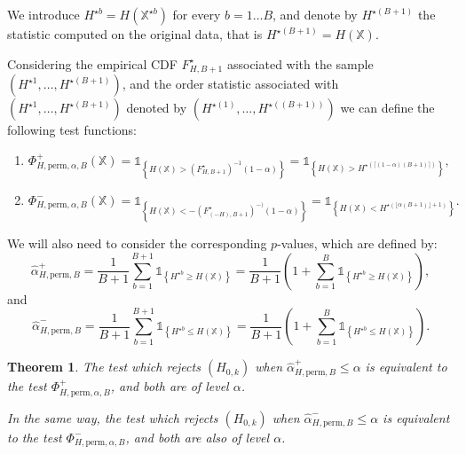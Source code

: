 \documentclass[a4paper,oneside,10pt]{article}
\newtheorem{thm}{Theorem}[subsection]
\newcommand{\pa}[1]{\ensuremath{\left( #1 \right)}}
\newcommand{\X}{\ensuremath{\mathds{X}}}
\newcommand{\1}[1]{\ensuremath{\mathds{1}_{\left\{ #1 \right\}}}}  %
\begin{document}
We introduce $H^{\star b}=H(\X^{\star b})$ for every $b=1\ldots B$, and denote by $H^{\star (B+1)}$ the statistic computed on the original data, that is $H^{\star (B+1)}=H(\X)$.

Considering the empirical CDF  $F^\star_{H,B+1}$  associated with the sample $\pa{H^{\star 1},\ldots,H^{\star (B+1)}}$,  and the order statistic associated with  $\pa{H^{\star 1},\ldots,H^{\star (B+1)}}$ denoted by
$\pa{H^{\star (1)},\ldots,H^{\star ((B+1))}}$ we can define the following test functions: 

\begin{enumerate}
\item $\Phi_{H,\textrm{perm},\alpha,B}^{+}(\X)=\1{H(\X)>\pa{F^\star_{H,B+1}}^{-1}(1-\alpha)}
=\1{H(\X)>H^{\star (\lceil (1-\alpha)(B+1) \rceil)}},$
\item $\Phi_{H,\textrm{perm},\alpha,B}^{-}(\X)=\1{H(\X)<-\pa{F^\star_{(-H),B+1}}^{-)}(1-\alpha)}
=\1{H(\X)<H^{\star (\lfloor \alpha (B+1) \rfloor + 1 )}}.$
\end{enumerate}

We will also need to consider the corresponding $p$-values, which are defined by:
$$\hat{\alpha}^+_{H,\textrm{perm},B}=\frac{1}{B+1}\sum_{b=1}^{B+1} \1{H^{\star b} \geq H(\X)}=\frac{1}{B+1}\pa{1+\sum_{b=1}^B \1{H^{\star b}\geq H(\X)}},$$
and 
$$\hat{\alpha}^-_{H,\textrm{perm},B}=\frac{1}{B+1}\sum_{b=1}^{B+1} \1{H^{\star b}\leq H(\X)}=\frac{1}{B+1}\pa{1+\sum_{b=1}^B \1{H^{\star b}\leq H(\X)}}.$$

\begin{thm}
The test which rejects $(H_{0,k})$ when $\hat{\alpha}^+_{H,\textrm{perm},B}\leq \alpha$ is equivalent to the test $\Phi_{H,\textrm{perm},\alpha,B}^+$, and both are of level $\alpha$.

In the same way, the test which rejects $(H_{0,k})$ when $\hat{\alpha}^-_{H,\textrm{perm},B}\leq \alpha$ is equivalent to the test $ \Phi_{H,\textrm{perm},\alpha,B}^-$, and both are also of level $\alpha$.
\end{thm}
\end{document}
